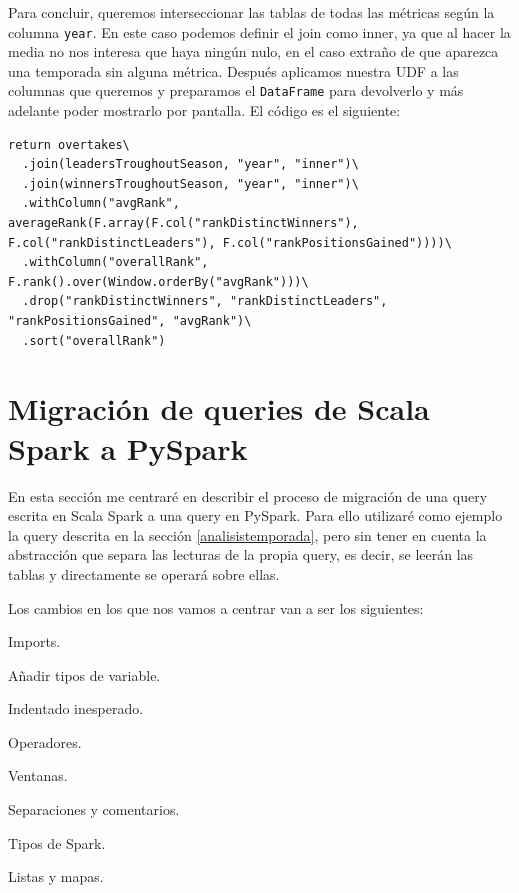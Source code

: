 \documentclass[12pt,twoside,titlepage]{report}
\begin{document}
Para concluir, queremos interseccionar las tablas de todas las métricas según la columna \texttt{year}. En este caso podemos definir el join como inner, ya que al hacer la media no nos interesa que haya ningún nulo, en el caso extraño de que aparezca una temporada sin alguna métrica. Después aplicamos nuestra UDF a las columnas que queremos y preparamos el \texttt{DataFrame} para devolverlo y más adelante poder mostrarlo por pantalla. El código es el siguiente:

\begin{lstlisting}
return overtakes\
  .join(leadersTroughoutSeason, "year", "inner")\
  .join(winnersTroughoutSeason, "year", "inner")\
  .withColumn("avgRank", averageRank(F.array(F.col("rankDistinctWinners"), F.col("rankDistinctLeaders"), F.col("rankPositionsGained"))))\
  .withColumn("overallRank", F.rank().over(Window.orderBy("avgRank")))\
  .drop("rankDistinctWinners", "rankDistinctLeaders", "rankPositionsGained", "avgRank")\
  .sort("overallRank")
\end{lstlisting}



\section{Migración de queries de Scala Spark a PySpark}
\label{sec:migracion}

En esta sección me centraré en describir el proceso de migración de una query escrita en Scala Spark a una query en PySpark. Para ello utilizaré como ejemplo la query descrita en la sección \ref{analisistemporada}, pero sin tener en cuenta la abstracción que separa las lecturas de la propia query, es decir, se leerán las tablas y directamente se operará sobre ellas.

Los cambios en los que nos vamos a centrar van a ser los siguientes:

\begin{compactitem}
	\item Imports.
	\item Añadir tipos de variable.
	\item Indentado inesperado.
	\item Operadores.
	\item Ventanas.
	\item Separaciones y comentarios.
	\item Tipos de Spark.
	\item Listas y mapas.
\end{compactitem}
\end{document}
